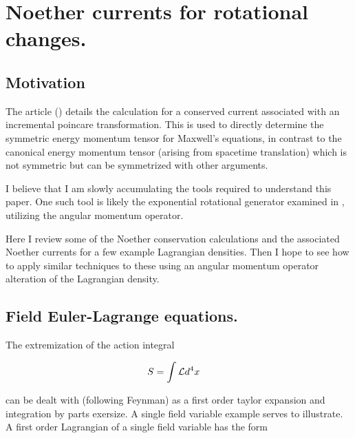

\chapter{Noether currents for rotational changes.}
\label{chap:rotationCurrents}
{}
\date{Sept 4, 2009}

\beginArtWithToc

\section{Motivation}

The article (\cite{montesinos2006sem}) details the calculation for a conserved current associated with an incremental poincare transformation.  This is used to directly determine the symmetric energy momentum tensor for Maxwell's equations, in contrast to the canonical energy momentum tensor (arising from spacetime translation) which is not symmetric but can be symmetrized with other arguments.

I believe that I am slowly accumulating the tools required to understand this paper.  One such tool is likely the exponential rotational generator examined in , utilizing the angular momentum operator.

Here I review some of the Noether conservation calculations and the associated Noether currents for a few example Lagrangian densities.  Then I hope to see how to apply similar techniques to these using an angular momentum operator alteration of the Lagrangian density.

\section{Field Euler-Lagrange equations.}

The extremization of the action integral

\begin{align}\label{eqn:rotationCurrents:boo1}
S &= \int \mathcal{L} d^4 x
\end{align}

can be dealt with (following Feynman) as a first order taylor expansion and integration by parts exersize.  A single field variable example serves to illustrate.  A first order Lagrangian of a single field variable has the form

